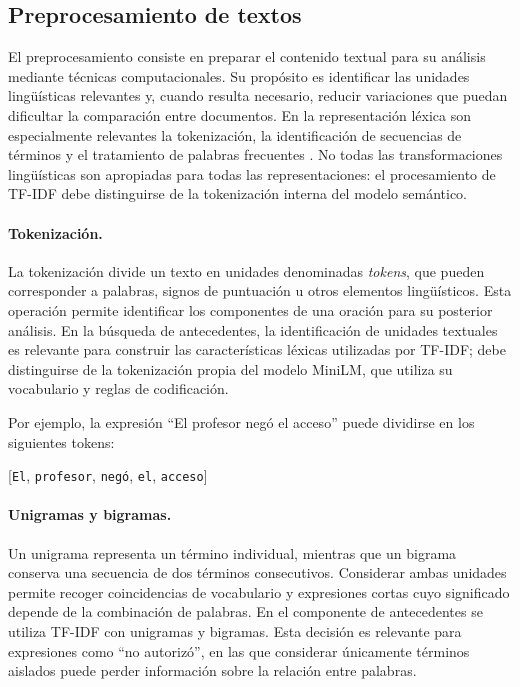 \subsection{Preprocesamiento de textos}

El preprocesamiento consiste en preparar el contenido textual para su análisis mediante técnicas computacionales. Su propósito es identificar las unidades lingüísticas relevantes y, cuando resulta necesario, reducir variaciones que puedan dificultar la comparación entre documentos. En la representación léxica son especialmente relevantes la tokenización, la identificación de secuencias de términos y el tratamiento de palabras frecuentes \cite{jurafsky2023slp}. No todas las transformaciones lingüísticas son apropiadas para todas las representaciones: el procesamiento de TF-IDF debe distinguirse de la tokenización interna del modelo semántico.

\paragraph{Tokenización.}

La tokenización divide un texto en unidades denominadas \textit{tokens}, que pueden corresponder a palabras, signos de puntuación u otros elementos lingüísticos. Esta operación permite identificar los componentes de una oración para su posterior análisis. En la búsqueda de antecedentes, la identificación de unidades textuales es relevante para construir las características léxicas utilizadas por TF-IDF; debe distinguirse de la tokenización propia del modelo MiniLM, que utiliza su vocabulario y reglas de codificación.

Por ejemplo, la expresión ``El profesor negó el acceso'' puede dividirse en los siguientes tokens:

\begin{center}
    [\texttt{El}, \texttt{profesor}, \texttt{negó},
    \texttt{el}, \texttt{acceso}]
\end{center}

\paragraph{Unigramas y bigramas.}

Un unigrama representa un término individual, mientras que un bigrama conserva una secuencia de dos términos consecutivos. Considerar ambas unidades permite recoger coincidencias de vocabulario y expresiones cortas cuyo significado depende de la combinación de palabras. En el componente de antecedentes se utiliza TF-IDF con unigramas y bigramas. Esta decisión es relevante para expresiones como ``no autorizó'', en las que considerar únicamente términos aislados puede perder información sobre la relación entre palabras.

